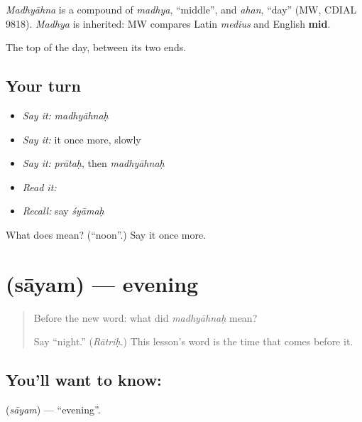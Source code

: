 \begin{cousinweb}
\emph{Madhyāhna} is a compound of \emph{madhya}, \textquotedblleft{}middle\textquotedblright{}, and \emph{ahan}, \textquotedblleft{}day\textquotedblright{} (MW, CDIAL 9818). \emph{Madhya} is inherited: MW compares Latin \emph{medius} and English \textbf{mid}.
\end{cousinweb}

\begin{grammarlens}[title={What you've built}]
The top of the day, between its two ends.
\end{grammarlens}

\subsection*{Your turn}
\begin{itemize}
\raggedright
  \item \emph{Say it:} \emph{madhyāhnaḥ}
  \item \emph{Say it:} it once more, slowly
  \item \emph{Say it:} \emph{prātaḥ}, then \emph{madhyāhnaḥ}
  \item \emph{Read it:} \textbf{}
  \item \emph{Recall:} say \emph{śyāmaḥ}
\end{itemize}

\begin{tcolorbox}[breakable,colback=teal!4,colframe=teal!35!black,title={Before you move on}]
What does  mean? (\textquotedblleft{}noon\textquotedblright{}.) Say it once more.
\end{tcolorbox}
\section[\texorpdfstring{\sk{सायम्} (sāyam)}{सायम् (sāyam)}]{ (sāyam) — evening}

\label{lesson:SA-C45-evening}



\begin{quote}
Before the new word: what did \emph{madhyāhnaḥ} mean?

Say \textquotedblleft{}night.\textquotedblright{} (\emph{Rātriḥ}.) This lesson's word is the time that comes before it.
\end{quote}

\subsection*{You'll want to know: }
\textbf{} (\emph{sāyam}) — \textquotedblleft{}evening\textquotedblright{}.

